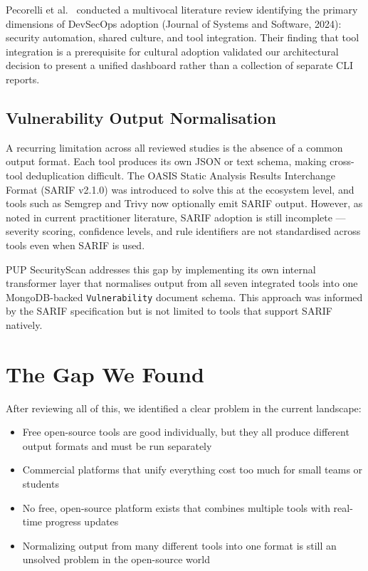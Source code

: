 \documentclass[12pt,a4paper]{report}
\begin{document}
Pecorelli et al.~\cite{pecorelli2024} conducted a multivocal literature review identifying the primary dimensions of DevSecOps adoption (Journal of Systems and Software, 2024): security automation, shared culture, and tool integration. Their finding that tool integration is a prerequisite for cultural adoption validated our architectural decision to present a unified dashboard rather than a collection of separate CLI reports.

\subsection{Vulnerability Output Normalisation}

A recurring limitation across all reviewed studies is the absence of a common output format. Each tool produces its own JSON or text schema, making cross-tool deduplication difficult. The OASIS Static Analysis Results Interchange Format (SARIF v2.1.0) was introduced to solve this at the ecosystem level, and tools such as Semgrep and Trivy now optionally emit SARIF output. However, as noted in current practitioner literature, SARIF adoption is still incomplete --- severity scoring, confidence levels, and rule identifiers are not standardised across tools even when SARIF is used.

PUP SecurityScan addresses this gap by implementing its own internal transformer layer that normalises output from all seven integrated tools into one MongoDB-backed \texttt{Vulnerability} document schema. This approach was informed by the SARIF specification but is not limited to tools that support SARIF natively.

\section{The Gap We Found}

After reviewing all of this, we identified a clear problem in the current landscape:

\begin{itemize}
    \item Free open-source tools are good individually, but they all produce different output formats and must be run separately
    \item Commercial platforms that unify everything cost too much for small teams or students
    \item No free, open-source platform exists that combines multiple tools with real-time progress updates
    \item Normalizing output from many different tools into one format is still an unsolved problem in the open-source world
\end{itemize}
\end{document}
